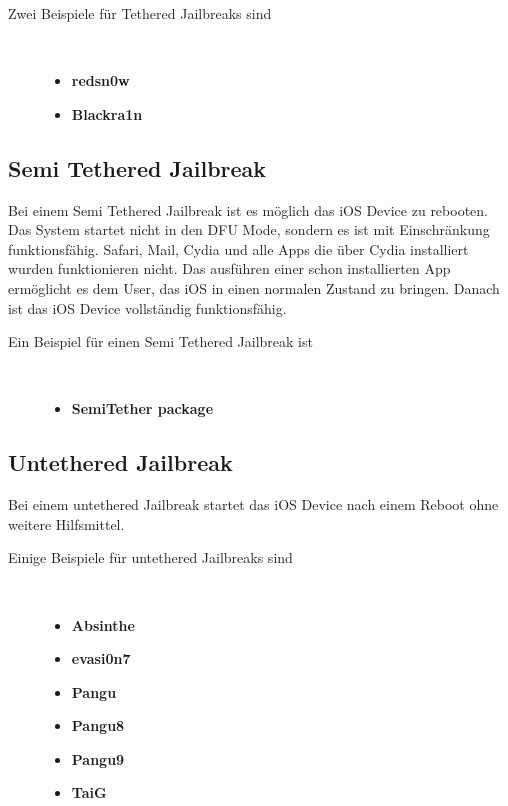 \begin{description}
\item[Zwei Beispiele für \glqq Tethered Jailbreaks\grqq{} sind]~\par
	\begin{itemize}
        \item \textbf{redsn0w}
        \item \textbf{Blackra1n}
    \end{itemize}
\end{description} 

\subsection{Semi Tethered Jailbreak}
\label{sec:JBSemiTethered}

Bei einem \glqq Semi Tethered Jailbreak\grqq{} ist es möglich das iOS Device
zu rebooten. Das System startet nicht in den DFU Mode, sondern es ist
mit Einschränkung funktionsfähig. Safari, Mail, Cydia und alle Apps die über
Cydia installiert wurden funktionieren nicht. Das ausführen einer schon
installierten App ermöglicht es dem User, das iOS in einen normalen Zustand zu
bringen. Danach ist das iOS Device vollständig funktionsfähig.

\begin{description}
\item[Ein Beispiel für einen \glqq Semi Tethered Jailbreak\grqq{} ist]~\par
	\begin{itemize}
        \item \textbf{SemiTether package}
    \end{itemize}
\end{description} 

\subsection{Untethered Jailbreak}
\label{sec:JBUntethered}

Bei einem \glqq untethered Jailbreak\grqq{} startet das iOS Device nach einem
Reboot ohne weitere Hilfsmittel.  
\begin{description}
\item[Einige Beispiele für \glqq untethered Jailbreaks\grqq{} sind]~\par
	\begin{multicols}{2}
	\begin{itemize}
        \item \textbf{Absinthe}
        \item \textbf{evasi0n7}
        \item \textbf{Pangu}
        \item \textbf{Pangu8}
        \item \textbf{Pangu9}
        \item \textbf{TaiG}
    \end{itemize}
    \end{multicols}
\end{description} 

